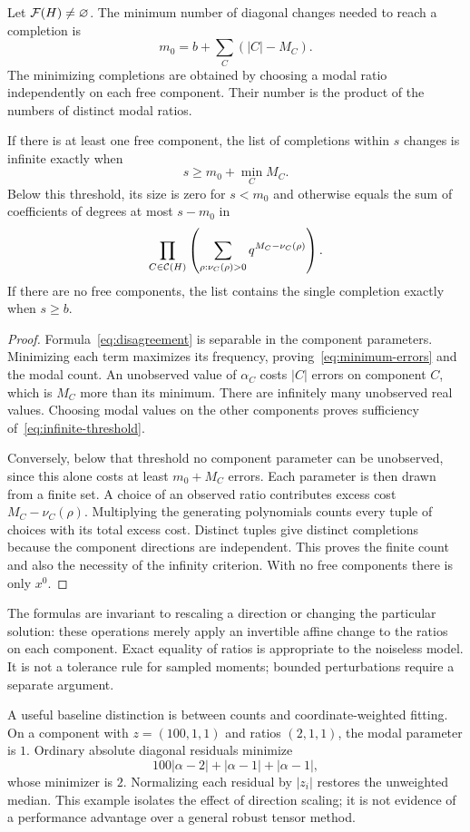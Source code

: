 \begin{theorem}\label{thm:list}
Let $\mathcal F(H)\ne\varnothing$. The minimum number of diagonal changes needed to reach a completion is
\begin{equation}\label{eq:minimum-errors}
 m_0=b+\sum_C(|C|-M_C).
\end{equation}
The minimizing completions are obtained by choosing a modal ratio independently on each free component. Their number is the product of the numbers of distinct modal ratios.

If there is at least one free component, the list of completions within $s$ changes is infinite exactly when
\begin{equation}\label{eq:infinite-threshold}
 s\ge m_0+\min_C M_C.
\end{equation}
Below this threshold, its size is zero for $s<m_0$ and otherwise equals the sum of coefficients of degrees at most $s-m_0$ in
\begin{equation}\label{eq:list-polynomial}
 \prod_{C\in\mathcal C(H)}
 \left(\sum_{\rho:\nu_C(\rho)>0}q^{M_C-\nu_C(\rho)}\right).
\end{equation}
If there are no free components, the list contains the single completion exactly when $s\ge b$.
\end{theorem}
\begin{proof}
Formula~\eqref{eq:disagreement} is separable in the component parameters. Minimizing each term maximizes its frequency, proving~\eqref{eq:minimum-errors} and the modal count. An unobserved value of $\alpha_C$ costs $|C|$ errors on component $C$, which is $M_C$ more than its minimum. There are infinitely many unobserved real values. Choosing modal values on the other components proves sufficiency of~\eqref{eq:infinite-threshold}.

Conversely, below that threshold no component parameter can be unobserved, since this alone costs at least $m_0+M_C$ errors. Each parameter is then drawn from a finite set. A choice of an observed ratio contributes excess cost $M_C-\nu_C(\rho)$. Multiplying the generating polynomials counts every tuple of choices with its total excess cost. Distinct tuples give distinct completions because the component directions are independent. This proves the finite count and also the necessity of the infinity criterion. With no free components there is only $x^0$.
\end{proof}

The formulas are invariant to rescaling a direction or changing the particular solution: these operations merely apply an invertible affine change to the ratios on each component. Exact equality of ratios is appropriate to the noiseless model. It is not a tolerance rule for sampled moments; bounded perturbations require a separate argument.

A useful baseline distinction is between counts and coordinate-weighted fitting. On a component with $z=(100,1,1)$ and ratios $(2,1,1)$, the modal parameter is $1$. Ordinary absolute diagonal residuals minimize
\[
 100|\alpha-2|+|\alpha-1|+|\alpha-1|,
\]
whose minimizer is $2$. Normalizing each residual by $|z_i|$ restores the unweighted median. This example isolates the effect of direction scaling; it is not evidence of a performance advantage over a general robust tensor method.
